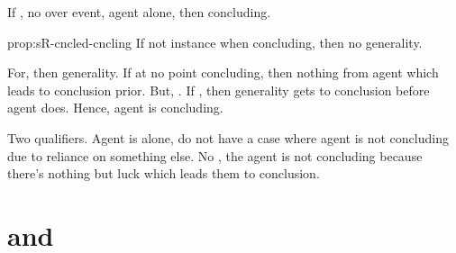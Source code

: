\begin{note}
  \begin{proposition}
    \label{prop:sR-cncled-cncling}
    If \sR[conclusion]{}, no \ninf{} over event, agent alone, then concluding.
  \end{proposition}
  \begin{argument}{prop:sR-cncled-cncling}
    If not instance when concluding, then no generality.

    For, \sR{} then generality.
    If at no point concluding, then nothing from agent which leads to conclusion prior.
    But, \sR{}.
    If \sR{}, then generality gets to conclusion before agent does.
    Hence, agent is concluding.

    Two qualifiers.
    Agent is alone, do not have a case where agent is not concluding due to reliance on something else.
    No \ninf{}, the agent is not concluding because there's nothing but luck which leads them to conclusion.
  \end{argument}
\end{note}

\section{ and }


